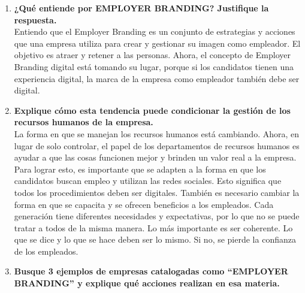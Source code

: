 \documentclass[12pt, a4paper]{article}
\begin{document}
\begin{enumerate}[label=\textbf{\arabic*.}, leftmargin=*, topsep=10pt, itemsep=15pt]

    \item \textbf{¿Qué entiende por EMPLOYER BRANDING? Justifique la respuesta.} \\
    Entiendo que el Employer Branding es 
    un conjunto de estrategias y acciones que una empresa utiliza 
    para crear y gestionar su imagen como empleador. El objetivo es 
    atraer y retener a las personas. Ahora, el concepto de Employer
     Branding digital está tomando su lugar, porque si los candidatos 
     tienen una experiencia digital,
     la marca de la empresa como empleador también debe ser digital.

    \item \textbf{Explique cómo esta tendencia puede condicionar la gestión de los recursos humanos de la empresa.} \\
    La forma en que se manejan los recursos humanos está cambiando. 
    Ahora, en lugar de solo controlar, el papel de los departamentos de recursos humanos es 
    ayudar a que las cosas funcionen mejor y brinden un valor real a la empresa.
    Para lograr esto, es importante que se adapten a la forma en que los candidatos buscan 
    empleo y utilizan las redes sociales. Esto significa que todos los procedimientos deben ser digitales.
    También es necesario cambiar la forma en que se capacita y se ofrecen beneficios a los empleados.
     Cada generación tiene diferentes necesidades y expectativas, por lo que no se puede tratar a todos
     de la misma manera.
    Lo más importante es ser coherente. Lo que se dice y lo que se hace deben ser lo mismo.
     Si no, se pierde la confianza de los empleados.

    \item \textbf{Busque 3 ejemplos de empresas catalogadas como “EMPLOYER BRANDING” y explique qué acciones realizan en esa materia.} \\
    

\end{enumerate}
\end{document}
